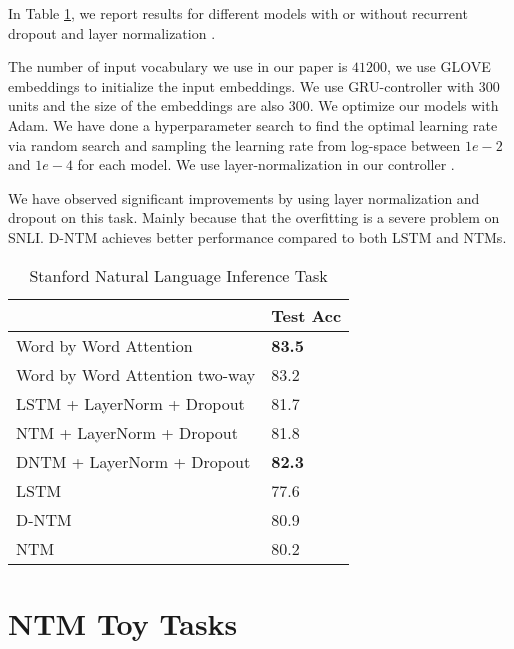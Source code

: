 \documentclass[12pt]{article}
\begin{document}
In Table \ref{tbl:snli_ntm_res}, we report results for different models with or without recurrent dropout \citep{semeniuta2016recurrent} and layer normalization \citep{ba2016layer}.

The number of input vocabulary we use in our paper is $41200$, we use GLOVE~\citep{pennington2014glove} embeddings to initialize the input embeddings. We use GRU-controller with 300 units and the size of the embeddings are also 300. We optimize our models with Adam. We have done a hyperparameter search to find the optimal learning rate via random search and sampling the learning rate from log-space between $1e-2$ and $1e-4$ for each model. We use layer-normalization in our controller \citep{ba2016layer}. 

We have observed significant improvements by using layer normalization and dropout on this task. Mainly because that the overfitting is a severe problem on SNLI. D-NTM achieves better performance compared to both LSTM and NTMs.

\begin{table}[htbp]
\centering
\footnotesize
\begin{tabular}{@{}ll@{}}
\toprule
                                                    & Test  Acc \\ \midrule
                                                                \hline
            Word by Word Attention\citep{rocktaschel2015reasoning} & \textbf{83.5} \\
            Word by Word Attention two-way\citep{rocktaschel2015reasoning} & 83.2 \\
            \hline
            LSTM + LayerNorm + Dropout & 81.7 \\
            NTM + LayerNorm + Dropout & 81.8 \\
            DNTM + LayerNorm + Dropout & \textbf{82.3} \\
            LSTM \citep{bowman2015large} & 77.6 \\
            D-NTM & 80.9 \\
            NTM & 80.2 \\ \bottomrule
\end{tabular}
\caption{ Stanford Natural Language Inference Task}
\label{tbl:snli_ntm_res}

\end{table}



\section{NTM Toy Tasks}
\end{document}
